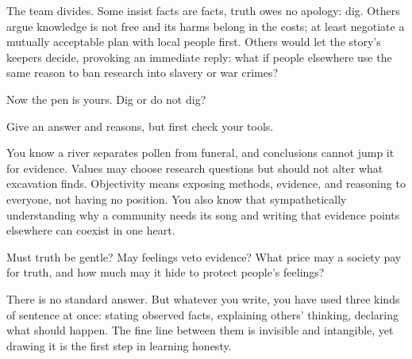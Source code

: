 The team divides. Some insist facts are facts, truth owes no apology: dig. Others argue knowledge is not free and its harms belong in the costs; at least negotiate a mutually acceptable plan with local people first. Others would let the story's keepers decide, provoking an immediate reply: what if people elsewhere use the same reason to ban research into slavery or war crimes?

Now the pen is yours. Dig or do not dig?

Give an answer and reasons, but first check your tools.

You know a river separates pollen from funeral, and conclusions cannot jump it for evidence. Values may choose research questions but should not alter what excavation finds. Objectivity means exposing methods, evidence, and reasoning to everyone, not having no position. You also know that sympathetically understanding why a community needs its song and writing that evidence points elsewhere can coexist in one heart.

Must truth be gentle? May feelings veto evidence? What price may a society pay for truth, and how much may it hide to protect people's feelings?

There is no standard answer. But whatever you write, you have used three kinds of sentence at once: stating observed facts, explaining others' thinking, declaring what should happen. The fine line between them is invisible and intangible, yet drawing it is the first step in learning honesty.

